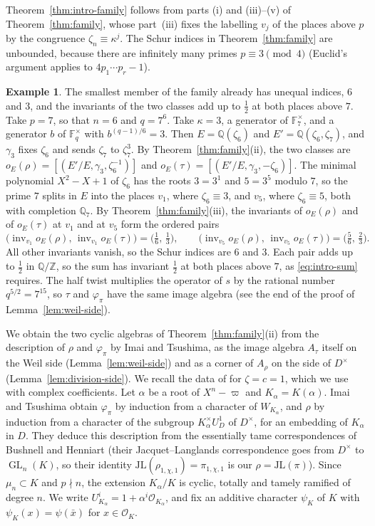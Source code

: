 \documentclass[a4paper,11pt]{amsart}
\theoremstyle{definition}
\newtheorem{example}[theorem]{Example}
\theoremstyle{remark}
\numberwithin{equation}{section}
\newcommand{\Q}{\mathbb{Q}}
\newcommand{\Z}{\mathbb{Z}}
\DeclareMathOperator{\inv}{inv}
\DeclareMathOperator{\GL}{GL}
\newcommand{\F}{\mathbb{F}}
\newcommand{\JL}{\mathrm{JL}}
\begin{document}
Theorem~\ref{thm:intro-family} follows from parts (i) and (iii)--(v) of Theorem~\ref{thm:family}, whose part~(iii) fixes the labelling $v_j$ of the places above $p$ by the congruence $\zeta_n\equiv\kappa^j$. The Schur indices in Theorem~\ref{thm:family} are unbounded, because there are infinitely many primes $p\equiv3\pmod4$ (Euclid's argument applies to $4p_1\cdots p_r-1$).

\begin{example}\label{ex:rank-six}
The smallest member of the family already has unequal indices, $6$ and $3$, and the invariants of the two classes add up to $\frac12$ at both places above $7$. Take $p=7$, so that $n=6$ and $q=7^6$. Take $\kappa=3$, a generator of $\F_7^\times$, and a generator $b$ of $\F_q^\times$ with $b^{(q-1)/6}=3$. Then $E=\Q(\zeta_6)$ and $E'=\Q(\zeta_6,\zeta_7)$, and $\gamma_3$ fixes $\zeta_6$ and sends $\zeta_7$ to $\zeta_7^3$. By Theorem~\ref{thm:family}(ii), the two classes are $o_E(\rho)=[(E'/E,\gamma_3,\zeta_6^{-1})]$ and $o_E(\tau)=[(E'/E,\gamma_3,-\zeta_6)]$. The minimal polynomial $X^2-X+1$ of $\zeta_6$ has the roots $3=3^1$ and $5=3^5$ modulo $7$, so the prime $7$ splits in $E$ into the places $v_1$, where $\zeta_6\equiv3$, and $v_5$, where $\zeta_6\equiv5$, both with completion $\Q_7$. By Theorem~\ref{thm:family}(iii), the invariants of $o_E(\rho)$ and of $o_E(\tau)$ at $v_1$ and at $v_5$ form the ordered pairs
\[
 \bigl(\inv_{v_1}o_E(\rho),\,\inv_{v_1}o_E(\tau)\bigr)=\bigl(\tfrac16,\,\tfrac13\bigr),\qquad \bigl(\inv_{v_5}o_E(\rho),\,\inv_{v_5}o_E(\tau)\bigr)=\bigl(\tfrac56,\,\tfrac23\bigr).
\]
All other invariants vanish, so the Schur indices are $6$ and $3$. Each pair adds up to $\frac12$ in $\Q/\Z$, so the sum has invariant $\frac12$ at both places above $7$, as \eqref{eq:intro-sum} requires. The half twist multiplies the operator of $s$ by the rational number $q^{5/2}=7^{15}$, so $\tau$ and $\varphi_\pi$ have the same image algebra (see the end of the proof of Lemma~\ref{lem:weil-side}).
\end{example}

We obtain the two cyclic algebras of Theorem~\ref{thm:family}(ii) from the description of $\rho$ and $\varphi_\pi$ by Imai and Tsushima, as the image algebra $A_\tau$ itself on the Weil side (Lemma~\ref{lem:weil-side}) and as a corner of $A_\rho$ on the side of $D^\times$ (Lemma~\ref{lem:division-side}). We recall the data of \cite[\S5.1]{IT20} for $\zeta=c=1$, which we use with complex coefficients. Let $\alpha$ be a root of $X^n-\varpi$ and $K_\alpha=K(\alpha)$. Imai and Tsushima obtain $\varphi_\pi$ by induction from a character of $W_{K_\alpha}$, and $\rho$ by induction from a character of the subgroup $K_\alpha^\times U_D^1$ of $D^\times$, for an embedding of $K_\alpha$ in $D$. They deduce this description from the essentially tame correspondences of Bushnell and Henniart \cite{BH05,BH11J} (their Jacquet--Langlands correspondence goes from $D^\times$ to $\GL_n(K)$, so their identity $\JL(\rho_{1,\chi,1})=\pi_{1,\chi,1}$ is our $\rho=\JL(\pi)$). Since $\mu_n\subset K$ and $p\nmid n$, the extension $K_\alpha/K$ is cyclic, totally and tamely ramified of degree $n$. We write $U^i_{K_\alpha}=1+\alpha^i\mathcal O_{K_\alpha}$, and fix an additive character $\psi_K$ of $K$ with $\psi_K(x)=\psi(\bar x)$ for $x\in\mathcal O_K$.
\end{document}
